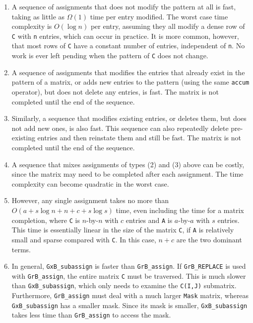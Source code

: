 \documentclass[12pt]{article}
\begin{document}
\begin{enumerate}

\item A sequence of assignments that does not modify the pattern at all is
fast, taking as little as $\Omega(1)$ time per entry modified.  The worst case
time complexity is $O(\log n)$ per entry, assuming they all modify a dense
row of \verb'C' with \verb'n' entries, which can occur in practice.  It is
more common, however, that most rows of \verb'C' have a constant number of
entries, independent of \verb'n'.  No work is ever left pending when the
pattern of \verb'C' does not change.

\item A sequence of assignments that modifies the entries that already exist in
the pattern of a matrix, or adds new entries to the pattern (using the same
\verb'accum' operator), but does not delete any entries, is fast.  The matrix
is not completed until the end of the sequence.

\item Similarly, a sequence that modifies existing entries, or deletes them,
but does not add new ones, is also fast.  This sequence can also repeatedly
delete pre-existing entries and then reinstate them and still be fast.  The
matrix is not completed until the end of the sequence.

\item A sequence that mixes assignments of types (2) and (3) above can be
costly, since the matrix may need to be completed after each assignment.  The
time complexity can become quadratic in the worst case.

\item However, any single assignment takes no more than $O (a + s \log n + n +
c + s \log s )$ time, even including the time for a matrix completion, where
\verb'C' is $n$-by-$n$ with $c$ entries and \verb'A' is $a$-by-$a$ with $s$
entries.  This time is essentially linear in the size of the matrix \verb'C',
if \verb'A' is relatively small and sparse compared with \verb'C'.  In this
case, $n+c$ are the two dominant terms.

\item In general, \verb'GxB_subassign' is faster than \verb'GrB_assign'.
If \verb'GrB_REPLACE' is used with \verb'GrB_assign', the entire matrix
\verb'C' must be traversed.  This is much slower than \verb'GxB_subassign',
which only needs to examine the \verb'C(I,J)' submatrix.  Furthermore,
\verb'GrB_assign' must deal with a much larger \verb'Mask' matrix, whereas
\verb'GxB_subassign' has a smaller mask.  Since its mask is smaller,
\verb'GxB_subassign' takes less time than \verb'GrB_assign' to access the mask.

\end{enumerate}
\end{document}
